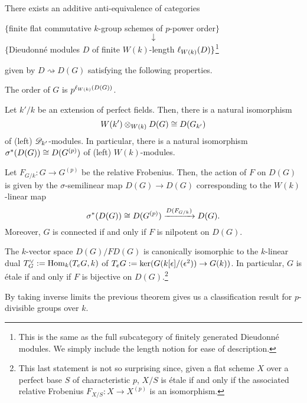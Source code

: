 \documentclass[11pt]{article}
\newcommand{\D}{\ms{D}}
\newcommand{\func}{\rightsquigarrow}
\begin{document}
\begin{theorem}
There exists an additive anti-equivalence of categories 
\begin{center}
$\{$finite flat commutative $k$-group schemes of $p$-power order$\}$ 
$$\downarrow$$
$\{$Dieudonn\'{e} modules $D$ of finite $W(k)$-length $\ell_{W(k)}(D)\}$\footnote{This is the same as the full subcategory of finitely generated Dieudonn\'{e} modules. We simply include the length notion for ease of description.}
\end{center}
given by $D\func D(G)$ satisfying the following properties.
\begin{enum}{\alph}
\item The order of $G$ is $p^{\ell_{W(k)}(D(G))}$.

\item Let $k'/k$ be an extension of perfect fields. Then, there is a natural isomorphism 
$$W(k')\otimes_{W(k)}D(G)\cong D(G_{k'})$$ 
of (left) $\D_{k'}$-modules. In particular, there is a natural isomorphism $\sigma^*(D(G))\cong D(G^{(p)})$ of (left) $W(k)$-modules.

\item Let $F_{G/k}: G\to G^{(p)}$ be the relative Frobenius. Then, the action of $F$ on $D(G)$ is given by the $\sigma$-semilinear map $D(G)\to D(G)$ corresponding to the $W(k)$-linear map 
$$\sigma^*(D(G))\cong D(G^{(p)})\xrightarrow{D(F_{G/k})}D(G).$$
Moreover, $G$ is connected if and only if $F$ is nilpotent on $D(G)$.

\item The $k$-vector space $D(G)/FD(G)$ is canonically isomorphic to the $k$-linear dual $T_G^{\vee}:=\operatorname{Hom}_k(T_eG,k)$ of $T_eG:=\ker(G(k[\epsilon]/(\epsilon^2))\to G(k))$. In particular, $G$ is \'{e}tale if and only if $F$ is bijective on $D(G)$.\footnote{This last statement is not so surprising since, given a flat scheme $X$ over a perfect base $S$ of characteristic $p$, $X/S$ is \'{e}tale if and only if the associated relative Frobenius $F_{X/S}: X\to X^{(p)}$ is an isomorphism.}
\end{enum}
\end{theorem}

By taking inverse limits the previous theorem gives us a classification result for $p$-divisible groups over $k$.
\end{document}

